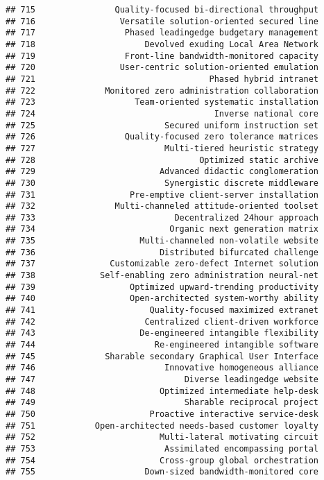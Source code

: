 \documentclass[
]{article}
\begin{document}
\begin{verbatim}
## 715                Quality-focused bi-directional throughput
## 716                 Versatile solution-oriented secured line
## 717                  Phased leadingedge budgetary management
## 718                      Devolved exuding Local Area Network
## 719                  Front-line bandwidth-monitored capacity
## 720                 User-centric solution-oriented emulation
## 721                                   Phased hybrid intranet
## 722              Monitored zero administration collaboration
## 723                    Team-oriented systematic installation
## 724                                    Inverse national core
## 725                          Secured uniform instruction set
## 726                  Quality-focused zero tolerance matrices
## 727                          Multi-tiered heuristic strategy
## 728                                 Optimized static archive
## 729                         Advanced didactic conglomeration
## 730                          Synergistic discrete middleware
## 731                   Pre-emptive client-server installation
## 732                Multi-channeled attitude-oriented toolset
## 733                            Decentralized 24hour approach
## 734                           Organic next generation matrix
## 735                     Multi-channeled non-volatile website
## 736                         Distributed bifurcated challenge
## 737               Customizable zero-defect Internet solution
## 738             Self-enabling zero administration neural-net
## 739                   Optimized upward-trending productivity
## 740                   Open-architected system-worthy ability
## 741                       Quality-focused maximized extranet
## 742                      Centralized client-driven workforce
## 743                     De-engineered intangible flexibility
## 744                        Re-engineered intangible software
## 745              Sharable secondary Graphical User Interface
## 746                          Innovative homogeneous alliance
## 747                              Diverse leadingedge website
## 748                         Optimized intermediate help-desk
## 749                              Sharable reciprocal project
## 750                       Proactive interactive service-desk
## 751            Open-architected needs-based customer loyalty
## 752                         Multi-lateral motivating circuit
## 753                          Assimilated encompassing portal
## 754                         Cross-group global orchestration
## 755                      Down-sized bandwidth-monitored core

\end{verbatim}
\end{document}
